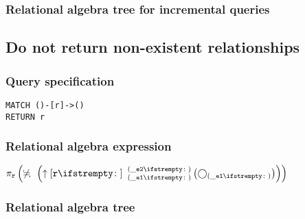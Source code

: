 \subsubsection*{Relational algebra tree for incremental queries}


\subsection{Do not return non-existent relationships}

\subsubsection*{Query specification}

\begin{lstlisting}
MATCH ()-[r]->()
RETURN r
\end{lstlisting}

\subsubsection*{Relational algebra expression}

$\projection{\var{r}} \left(\alldifferent{} \left(\expandout{r}{}{\_e1}{\_e2}{} \left(\getvertices{\_e1}{}\right)\right)\right)$

\subsubsection*{Relational algebra tree}


